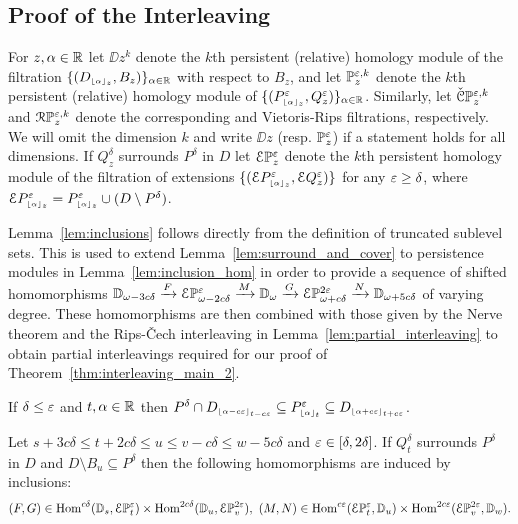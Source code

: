 
\subsection{Proof of the Interleaving}

For $z,\alpha\in\R$ let $\DD{z}^k$ denote the $k$th persistent (relative) homology module of the filtration $\{(D\subi{z}{\alpha},B_z)\}_{\alpha\in\R}$ with respect to $B_z$, and let $\PP{z}{\e,k}$ denote the $k$th persistent (relative) homology module of $\{(P\subi{z}{\alpha}^\e,Q_z^\e)\}_{\alpha\in\R}$.
Similarly, let $\CPP{z}{\e,k}$ and $\RPP{z}{\e,k}$ denote the corresponding \Cech and Vietoris-Rips filtrations, respectively.
We will omit the dimension $k$ and write $\DD{z}$ (resp. $\PP{z}{\e}$) if a statement holds for all dimensions.
If $Q_z^\delta$ surrounds $P^\delta$ in $D$ let $\ext{\PP{z}{\e}}$ denote the $k$th persistent homology module of the filtration of extensions $\{(\ext{P\subi{z}{\alpha}^\e},\ext{Q_z^\e})\}$ for any $\e\geq\delta$, where $\ext{P\subi{z}{\alpha}^\e} = P\subi{z}{\alpha}^\e \cup (D\setminus P^\delta)$.


Lemma~\ref{lem:inclusions} follows directly from the definition of truncated sublevel sets.
This is used to extend Lemma~\ref{lem:surround_and_cover} to persistence modules in Lemma~\ref{lem:inclusion_hom} in order to provide a sequence of shifted homomorphisms $\DD{\omega-3c\delta}\xrightarrow{F}\E\PP{\omega-2c\delta}{\e}\xrightarrow{M}\DD{\omega}\xrightarrow{G}\E\PP{\omega+c\delta}{2\e}\xrightarrow{N}\DD{\omega+5c\delta}$ of varying degree.
These homomorphisms are then combined with those given by the Nerve theorem and the Rips-\v Cech interleaving in Lemma~\ref{lem:partial_interleaving} to obtain partial interleavings required for our proof of Theorem~\ref{thm:interleaving_main_2}.

\begin{lemma}\label{lem:inclusions}
  If $\delta\leq\e$ and $t,\alpha\in\R$ then $P^\delta\cap D\subi{t-c\e}{\alpha-c\e}\subseteq P\subi{t}{\alpha}^\e\subseteq D\subi{t+c\e}{\alpha+c\e}$.
\end{lemma}

\begin{lemma}\label{lem:inclusion_hom}
  Let $s + 3c\delta\leq t + 2c\delta\leq u\leq v-c\delta\leq w-5c\delta$ and $\e\in [\delta,2\delta]$.
  If $Q_{t}^\delta$ surrounds $P^\delta$ in $D$ and $D\setminus B_u\subseteq P^\delta$ then the following homomorphisms are induced by inclusions:
  \[(F, G)\in \Hom^{c\delta}(\DD{s}, \E\PP{t}{\e})\times \Hom^{2c\delta}(\DD{u}, \E\PP{v}{2\e}),\ (M, N)\in \Hom^{c\e}(\E\PP{t}{\e},\DD{u})\times\Hom^{2c\e}(\E\PP{v}{2\e}, \DD{w}).\]
\end{lemma}

